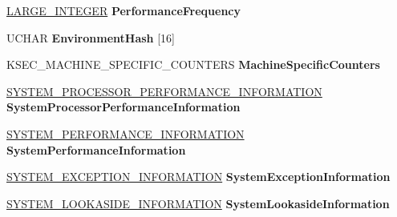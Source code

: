 \begin{DoxyCompactItemize}
\hyperlink{union___l_a_r_g_e___i_n_t_e_g_e_r}{L\+A\+R\+G\+E\+\_\+\+I\+N\+T\+E\+G\+ER} {\bfseries Performance\+Frequency}
\item 
\mbox{\label{struct___k_s_e_c___e_n_t_r_o_p_y___d_a_t_a_a36fea51e1c75403618538155428bd77e}} 
U\+C\+H\+AR {\bfseries Environment\+Hash} \mbox{[}16\mbox{]}
\item 
\mbox{\label{struct___k_s_e_c___e_n_t_r_o_p_y___d_a_t_a_a3b016219d2d04d4effbcee4fc140d438}} 
K\+S\+E\+C\+\_\+\+M\+A\+C\+H\+I\+N\+E\+\_\+\+S\+P\+E\+C\+I\+F\+I\+C\+\_\+\+C\+O\+U\+N\+T\+E\+RS {\bfseries Machine\+Specific\+Counters}
\item 
\mbox{\label{struct___k_s_e_c___e_n_t_r_o_p_y___d_a_t_a_a48ac07d280d7b26dd9fbcc03294f56e5}} 
\hyperlink{struct___s_y_s_t_e_m___p_r_o_c_e_s_s_o_r___p_e_r_f_o_r_m_a_n_c_e___i_n_f_o_r_m_a_t_i_o_n}{S\+Y\+S\+T\+E\+M\+\_\+\+P\+R\+O\+C\+E\+S\+S\+O\+R\+\_\+\+P\+E\+R\+F\+O\+R\+M\+A\+N\+C\+E\+\_\+\+I\+N\+F\+O\+R\+M\+A\+T\+I\+ON} {\bfseries System\+Processor\+Performance\+Information}
\item 
\mbox{\label{struct___k_s_e_c___e_n_t_r_o_p_y___d_a_t_a_a916ef0dabeb168eb23ffb59f0388e847}} 
\hyperlink{struct___s_y_s_t_e_m___p_e_r_f_o_r_m_a_n_c_e___i_n_f_o_r_m_a_t_i_o_n}{S\+Y\+S\+T\+E\+M\+\_\+\+P\+E\+R\+F\+O\+R\+M\+A\+N\+C\+E\+\_\+\+I\+N\+F\+O\+R\+M\+A\+T\+I\+ON} {\bfseries System\+Performance\+Information}
\item 
\mbox{\label{struct___k_s_e_c___e_n_t_r_o_p_y___d_a_t_a_a7fa4e4b0fc63812d7f15663779c53e02}} 
\hyperlink{struct___s_y_s_t_e_m___e_x_c_e_p_t_i_o_n___i_n_f_o_r_m_a_t_i_o_n}{S\+Y\+S\+T\+E\+M\+\_\+\+E\+X\+C\+E\+P\+T\+I\+O\+N\+\_\+\+I\+N\+F\+O\+R\+M\+A\+T\+I\+ON} {\bfseries System\+Exception\+Information}
\item 
\mbox{\label{struct___k_s_e_c___e_n_t_r_o_p_y___d_a_t_a_ad6e76ea66279dd0a5f8fc279968e8ca5}} 
\hyperlink{struct___s_y_s_t_e_m___l_o_o_k_a_s_i_d_e___i_n_f_o_r_m_a_t_i_o_n}{S\+Y\+S\+T\+E\+M\+\_\+\+L\+O\+O\+K\+A\+S\+I\+D\+E\+\_\+\+I\+N\+F\+O\+R\+M\+A\+T\+I\+ON} {\bfseries System\+Lookaside\+Information}

\end{DoxyCompactItemize}
